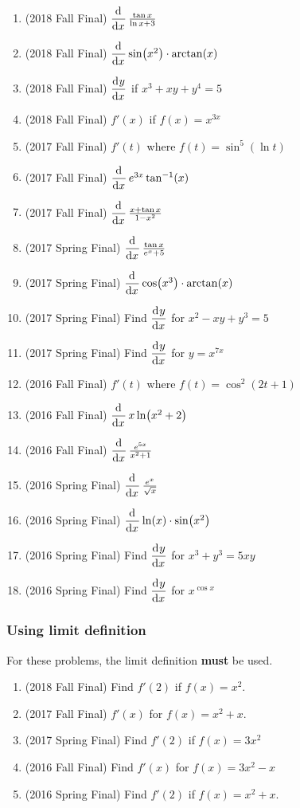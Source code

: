\documentclass[10pt]{scrartcl}
\newcommand{\inv}{^{-1}}
\begin{document}
\begin{enumerate}
\item (2018 Fall Final) $\dod{}{x} \frac{\tan x}{\ln x + 3}$
\item (2018 Fall Final) $\dod{}{x} \sin(x^2) \cdot \arctan(x)$
\item (2018 Fall Final) $\dod{y}{x}$ if $x^3 + xy + y^4 = 5$
\item (2018 Fall Final) $f'(x)$ if $f(x) = x^{3x}$
\item (2017 Fall Final) $f'(t)$ where $f(t) = \sin^5(\ln t)$
\item (2017 Fall Final) $\dod{}{x} e^{3x} \tan\inv(x)$
\item (2017 Fall Final) $\dod{}{x} \frac{x+\tan x}{1-x^2}$
\item (2017 Spring Final) $\dod{}{x} \frac{\tan x}{e^x + 5}$
\item (2017 Spring Final) $\dod{}{x} \cos(x^3) \cdot \arctan(x)$
\item (2017 Spring Final) Find $\dod yx$ for $x^2 - xy + y^3 = 5$
\item (2017 Spring Final) Find $\dod yx$ for $y = x^{7x}$
\item (2016 Fall Final) $f'(t)$ where $f(t) = \cos^2(2t+1)$
\item (2016 Fall Final) $\dod{}{x} x \ln(x^2 + 2)$
\item (2016 Fall Final) $\dod{}{x} \frac{e^{5x}}{x^2 + 1}$
\item (2016 Spring Final) $\dod{}{x} \frac{e^x}{\sqrt x}$
\item (2016 Spring Final) $\dod{}{x} \ln(x) \cdot \sin(x^2)$
\item (2016 Spring Final) Find $\dod yx$ for $x^3 + y^3 = 5xy$
\item (2016 Spring Final) Find $\dod yx$ for $x^{\cos x}$
\end{enumerate}

\subsubsection{Using limit definition}
For these problems, the limit definition \textbf{must} be used.
\begin{enumerate}
\item (2018 Fall Final) Find $f'(2)$ if $f(x) = x^2$.
\item (2017 Fall Final) $f'(x)$ for $f(x) = x^2 + x$. 
\item (2017 Spring Final) Find $f'(2)$ if $f(x) = 3x^2$
\item (2016 Fall Final) Find $f'(x)$ for $f(x) = 3x^2 - x$
\item (2016 Spring Final) Find $f'(2)$ if $f(x) = x^2 + x$.
\end{enumerate}
\end{document}
